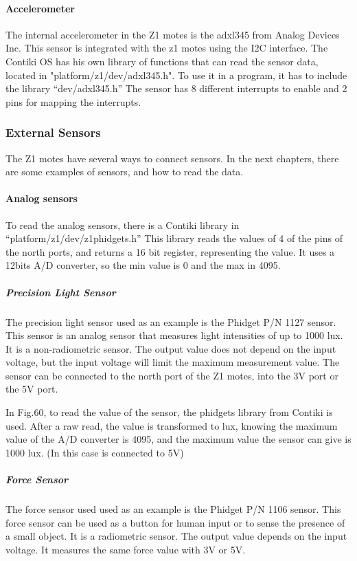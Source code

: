 \paragraph{Accelerometer}
The internal accelerometer in the Z1 motes is the adxl345 from Analog Devices Inc.
This sensor is integrated with the z1 motes using the I2C interface.
The Contiki OS has his own library of functions that can read the sensor data,
	located in "platform/z1/dev/adxl345.h".
To use it in a program,
	it has to include the library “dev/adxl345.h” The sensor has 8 different interrupts to enable and 2 pins for mapping the interrupts.

\subsubsection{External Sensors}
The Z1 motes have several ways to connect sensors.
In the next chapters,
	there are some examples of sensors,
	and how to read the data.

\paragraph{Analog sensors}

To read the analog sensors,
	there is a Contiki library in “platform/z1/dev/z1phidgets.h” This library reads the values of 4 of the pins of the north ports,
	and returns a 16 bit register,
	representing the value.
It uses a 12bits A/D converter,
	so the min value is 0 and the max in 4095.


\subparagraph{Precision Light Sensor}
The precision light sensor used as an example is the Phidget P/N 1127 sensor.
This sensor is an analog sensor that measures light intensities of up to 1000 lux.
It is a non-radiometric sensor.
The output value does not depend on the input voltage,
	but the input voltage will limit the maximum measurement value.
The sensor can be connected to the north port of the Z1 motes,
	into the 3V port or the 5V port.

In Fig.60,
	to read the value of the sensor,
	the phidgets library from Contiki is used.
After a raw read,
	the value is transformed to lux,
	knowing the maximum value of the A/D converter is 4095,
	and the maximum value the sensor can give is 1000 lux.
(In this case is connected to 5V) 


\subparagraph{Force Sensor}

The force sensor used used as an example is the Phidget P/N 1106 sensor.
This force sensor can be used as a button for human input or to sense the presence of a small object.
It is a radiometric sensor.
The output value depends on the input voltage.
It measures the same force value with 3V or 5V.

